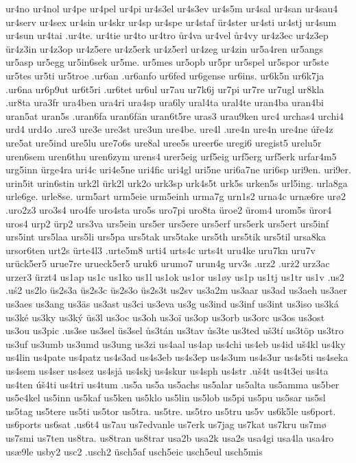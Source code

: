 {{ur4no
ur4nol
ur4pe
ur4pel
ur4pi
ur4s3el
ur4s3ev
ur4s5m
ur4sal
ur4san
ur4sau4
ur4serv
ur4sex
ur4sin
ur4skr
ur4sp
ur4spe
ur4staf
ür4ster
ur4sti
ur4stj
ur4sum
ur4sun
ur4tai
.ur4te.
ur4tie
ur4to
ur4tro
ůr4va
ur4vel
ůr4vy
ur4z3ec
ur4z3ep
ür4z3in
ur4z3op
ur4z5ere
ur4z5erk
ur4z5erl
ur4zeg
ur4zin
ur5a4ren
ur5angs
ur5asp
ur5egg
ur5in6sek
ur5me.
ur5mes
ur5opb
ur5pr
ur5spel
ur5spor
ur5ste
ur5tes
ur5ti
ur5troe
.ur6an
.ur6anfo
ur6fed
ur6gense
ur6ins.
ur6k5n
ur6k7ja
.ur6na
ur6p9ut
ur6t5ri
.ur6tet
ur6ul
ur7au
ur7k6j
ur7pi
ur7re
ur7ugl
ur8kla
.ur8ta
ura3fr
ura4ben
ura4ri
ura4sp
ura6ly
ural4ta
ural4te
uran4ba
uran4bi
uran5at
uran5s
.uran6fa
uran6fän
uran6t5re
uras3
urau9ken
urc4
urchas4
urchi4
urd4
urd4o
.ure3
ure3e
ure3st
ure3un
ure4be.
ure4l
.ure4n
ure4n
ure4ne
úře4z
ure5at
ure5ind
ure5lu
ure7o6s
ure8al
uree5s
ureer6e
uregi6
uregist5
urelu5r
uren6sem
uren6thu
uren6zym
urens4
urer5eig
urf5eig
urf5erg
urf5erk
urfar4m5
urg5inn
ürge4ra
uri4c
uri4e5ne
uri4fic
uri4gl
uri5ne
uri6a7ne
uri6sp
uri9en.
uri9er.
urin5it
urin6stin
urk2l
ürk2l
urk2o
urk3sp
urk4s5t
urk5s
urken5s
url5ing.
urla8ga
urle6ge.
urle8se.
urm5art
urm5eie
urm5einh
urma7g
urn1s2
urna4c
urnæ6re
urø2
.uro2z3
uro3s4
uro4fe
uro4sta
uro5s
uro7pi
uro8ta
üroe2
ürom4
urom5s
üror4
uros4
urp2
ürp2
urs3va
urs5ein
urs5er
urs5ere
urs5erf
urs5erk
urs5ert
urs5inf
urs5int
urs5laa
urs5li
urs5pa
urs5tak
urs5take
urs5th
urs5tik
urs5til
ursa8ka
ursor6ten
urt2s
ürte4l3
.urte5m8
urti4
urts4c
urts4t
uru4ke
uru7kn
uru7v
urück5er5
urue7re
urueck5er5
uruk6
urumo7
urun4g
urv3s
.urz2
.urż2
urz3ac
urzer3
ürzt4
us1ap
us1c
us1ko
us1l
us1ok
us1or
us1øy
us1p
us1tj
us1tr
us1v
.us2
.uś2
us2lo
üs2s3a
üs2s3c
üs2s3o
üs2s3t
us2sv
us3a2m
us3aar
us3ad
us3aeh
us3aer
us3aes
us3ang
us3äs
us3ast
us3ci
us3eva
us3g
us3ind
us3inf
us3int
us3iso
us3ká
us3ké
us3ky
us3ký
üs3l
us3oc
us3oh
us3oï
us3op
us3orb
us3orc
us3os
us3ost
us3ou
us3pic
.us3se
us3sel
üs3sel
ůs3tán
us3tav
ůs3te
us3ted
uš3tí
us3töp
us3tro
us3uf
us3umb
us3umd
us3ung
us3zi
us4aal
us4ap
us4chi
us4eb
us4id
uš4kl
us4ky
us4lin
us4pate
us4patz
us4s3ad
us4s3eb
us4s3ep
us4s3um
us4s3ur
us4s5ti
us4seka
us4sem
us4ser
us4sez
us4sjå
us4skj
us4skur
us4sph
us4str
.uš4t
us4t3ei
us4ta
us4ten
úš4ti
us4tri
us4tum
.us5a
us5a
us5achs
us5alar
us5alta
us5amma
us5ber
us5e4kel
us5inn
us5kaf
us5ken
us5klo
us5lin
us5lob
us5pi
us5pu
us5sar
us5sl
us5tag
us5tere
us5ti
us5tor
us5tra.
us5tre.
us5tro
us5tru
us5v
us6k5le
us6port.
us6ports
us6sat
.us6t4
us7au
us7edvanle
us7erk
us7jag
us7kat
us7kru
us7mø
us7smi
us7ten
us8tra.
us8tran
us8trar
usa2b
usa2k
usa2s
usa4gi
usa4la
usa4ro
usæ9le
usby2
usc2
.usch2
üsch5af
usch5eic
usch5eul
usch5mis
}}

